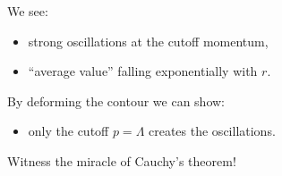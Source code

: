 \documentclass[aspectratio=169]{beamer}
\begin{document}



\begin{frame}
We see:

\begin{itemize}
\pause
\item strong \alert{oscillations} at the cutoff momentum,

\pause
\item \alert{``average value''} falling \alert{exponentially} with $r$.
\end{itemize}

\pause
\bigskip
By deforming the contour we can show:

\pause
\begin{itemize}
\item \alert{only} the cutoff $p = \Lambda$ creates the oscillations.
\end{itemize}
\end{frame}


\begin{frame}
Witness the miracle of \alert{Cauchy's theorem}!
\end{frame}




\end{document}
